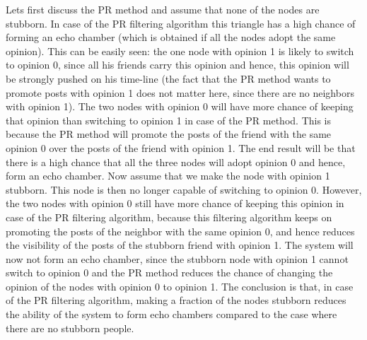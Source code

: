 \documentclass[11 pt , letterpaper , twoside , openright]{book}
\begin{document}
Lets first discuss the PR method and assume that none of the nodes are stubborn. In case of the PR filtering algorithm this triangle has a high chance of forming an echo chamber (which is obtained if all the nodes adopt the same opinion). This can be easily seen: the one node with opinion 1 is likely to switch to opinion 0, since all his friends carry this opinion and hence, this opinion will be strongly pushed on his time-line (the fact that the PR method wants to promote posts with opinion 1 does not matter here, since there are no neighbors with opinion 1). The two nodes with opinion 0 will have more chance of keeping that opinion than switching to opinion 1 in case of the PR method. This is because the PR method will promote the posts of the friend with the same opinion 0 over the posts of the friend with opinion 1. The end result will be that there is a high chance that all the three nodes will adopt opinion 0 and hence, form an echo chamber. Now assume that we make the node with opinion 1 stubborn. This node is then no longer capable of switching to opinion 0. However, the two nodes with opinion 0 still have more chance of keeping this opinion in case of the PR filtering algorithm, because this filtering algorithm keeps on promoting the posts of the neighbor with the same opinion 0, and hence reduces the visibility of the posts of the stubborn friend with opinion 1. The system will now not form an echo chamber, since the stubborn node with opinion 1 cannot switch to opinion 0 and the PR method reduces the chance of changing the opinion of the nodes with opinion 0 to opinion 1. The conclusion is that, in case of the PR filtering algorithm, making a fraction of the nodes stubborn reduces the ability of the system to form echo chambers compared to the case where there are no stubborn people.\\
\end{document}
